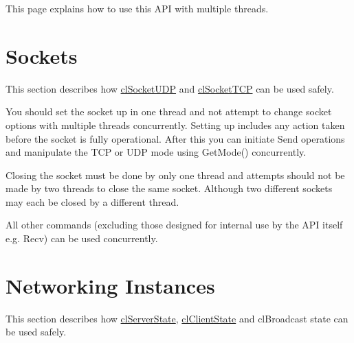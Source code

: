 This page explains how to use this API with multiple threads.\par
\par
\hypertarget{multithreadingpage_mtSockets}{}\section{Sockets}\label{multithreadingpage_mtSockets}
This section describes how \hyperlink{classcl_socket_u_d_p}{clSocketUDP} and \hyperlink{classcl_socket_t_c_p}{clSocketTCP} can be used safely.\par
\par


You should set the socket up in one thread and not attempt to change socket options with multiple threads concurrently. Setting up includes any action taken before the socket is fully operational. After this you can initiate Send operations and manipulate the TCP or UDP mode using GetMode() concurrently. \par
\par


Closing the socket must be done by only one thread and attempts should not be made by two threads to close the same socket. Although two different sockets may each be closed by a different thread. \par
\par


All other commands (excluding those designed for internal use by the API itself e.g. Recv) can be used concurrently.\par
\par
\hypertarget{multithreadingpage_mtNetInstances}{}\section{Networking Instances}\label{multithreadingpage_mtNetInstances}
This section describes how \hyperlink{classcl_server_state}{clServerState}, \hyperlink{classcl_client_state}{clClientState} and clBroadcast state can be used safely.\par
\par


